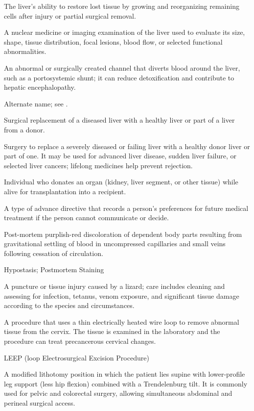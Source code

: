  The liver's ability to restore lost tissue by growing and reorganizing remaining cells after injury or partial surgical removal.

 A nuclear medicine or imaging examination of the liver used to evaluate its size, shape, tissue distribution, focal lesions, blood flow, or selected functional abnormalities.

 An abnormal or surgically created channel that diverts blood around the liver, such as a portosystemic shunt; it can reduce detoxification and contribute to hepatic encephalopathy.

 Alternate name; see .

 Surgical replacement of a diseased liver with a healthy liver or part of a liver from a donor.

 Surgery to replace a severely diseased or failing liver with a healthy donor liver or part of one. It may be used for advanced liver disease, sudden liver failure, or selected liver cancers; lifelong medicines help prevent rejection.

 Individual who donates an organ (kidney, liver segment, or other tissue) while alive for transplantation into a recipient.

 A type of advance directive that records a person's preferences for future medical treatment if the person cannot communicate or decide.

 Post-mortem purplish-red discoloration of dependent body parts resulting from
gravitational settling of blood in uncompressed capillaries and small veins following
cessation of circulation.

\synonyms
Hypostasis; Postmortem Staining

 A puncture or tissue injury caused by a lizard; care includes cleaning and assessing for infection, tetanus, venom exposure, and significant tissue damage according to the species and circumstances.

 A procedure that uses a thin electrically heated wire loop to remove abnormal tissue from the cervix. The tissue is examined in the laboratory and the procedure can treat precancerous cervical changes.

\synonyms
LEEP (loop Electrosurgical Excision Procedure)

 A modified lithotomy position in which the patient lies supine with lower-profile leg support (less hip flexion) combined with a Trendelenburg tilt. It is commonly used for pelvic and colorectal surgery, allowing simultaneous abdominal and perineal surgical access.

